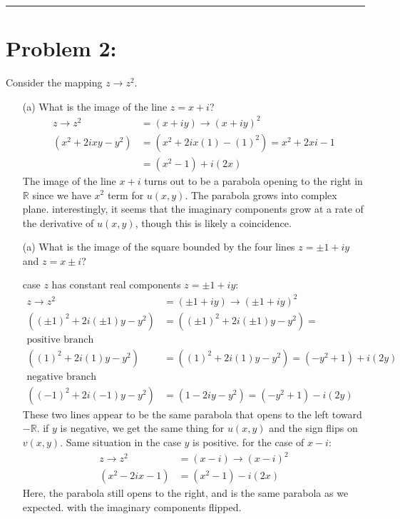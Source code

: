\documentclass{article}
\begin{document}
\vspace{1cm}
\hrule %

\newpage
\section*{Problem 2:}
Consider the mapping $z \xrightarrow{} z^2$.
\begin{enumerate}
\item[(a)] What is the image of the line $z  = x + i$?
  \begin{align*}
    z \xrightarrow{} z^2  &= (x+iy) \xrightarrow{} (x+iy)^2\\
    (x^2+2ixy-y^2) &= (x^2+2ix(1)-(1)^2) = x^2 + 2xi - 1 \\
    &= (x^2-1) + i(2x)   
  \end{align*}
  The image of the line $x+i$ turns out to be a parabola opening to the right in $\mathbb{R}$ since we have $x^2$ term for $u(x,y)$. The parabola grows into complex plane. interestingly, it seems that the imaginary components grow at a rate of the derivative of $u(x,y)$, though this is likely a coincidence.
  
\item[(a)] What is the image of the square bounded by the four lines $z  = \pm 1 + iy$ and $z = x \pm i$?

  case $z$ has constant real components $z  = \pm 1 + iy$:
  \begin{align*}
    z \xrightarrow{} z^2  &= (\pm 1+iy) \xrightarrow{} (\pm 1+iy)^2\\
    ((\pm 1)^2+2i(\pm 1)y-y^2) &= ((\pm 1)^2+2i(\pm 1)y-y^2) = \\
    \text{positive branch}&\\
    ((1)^2+2i(1)y-y^2) &= ((1)^2+2i(1)y-y^2) = (-y^2+1)+i(2y) \\
    \text{negative branch}&\\
    ((-1)^2+2i(-1)y-y^2) &= (1-2iy-y^2) = (-y^2+1)-i(2y)
  \end{align*}
  These two lines appear to be the same parabola that opens to the left toward $-\mathbb{R}$. if $y$ is negative, we get the same thing for $u(x,y)$ and the sign flips on $v(x,y)$. Same situation in the case $y$ is positive. 
  for the case of $x-i$:
    \begin{align*}
    z \xrightarrow{} z^2  &= (x-i) \xrightarrow{} (x-i)^2\\
    (x^2-2ix-1) &= (x^2-1) - i(2x)   
    \end{align*}
    Here, the parabola still opens to the right, and is the same parabola as we expected. with the imaginary components flipped.
\end{enumerate}
\end{document}
